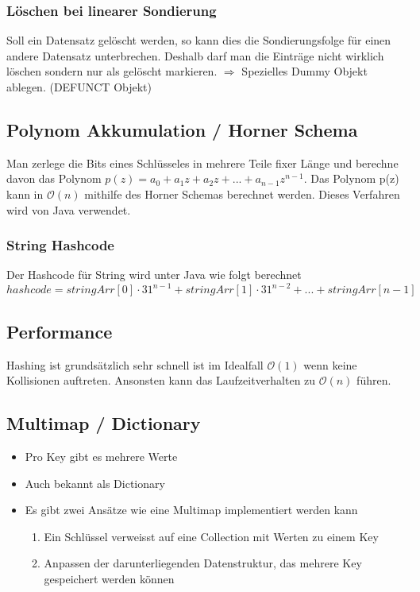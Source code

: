 \subsubsection{Löschen bei linearer Sondierung}
Soll ein Datensatz gelöscht werden, so kann dies die Sondierungsfolge für einen andere Datensatz unterbrechen. Deshalb darf man die Einträge nicht wirklich löschen sondern nur als gelöscht markieren. $\Rightarrow$ Spezielles Dummy Objekt ablegen. (DEFUNCT Objekt)

\subsection{Polynom Akkumulation / Horner Schema}
Man zerlege die Bits eines Schlüsseles in mehrere Teile fixer Länge und berechne davon das Polynom $p(z) = a_0 + a_1 z + a_2 z + ... + a_{n-1}z^{n-1}$. Das Polynom p(z) kann in $\mathcal{O}(n)$ mithilfe des Horner Schemas berechnet werden. Dieses Verfahren wird von Java verwendet.

\subsubsection{String Hashcode}
Der Hashcode für String wird unter Java wie folgt berechnet
\[
hashcode = stringArr[0] \cdot 31^{n-1} + stringArr[1] \cdot 31^{n-2} + ... + stringArr[n-1]
\]

\subsection{Performance}
Hashing ist grundsätzlich sehr schnell ist im Idealfall $\mathcal{O}(1)$ wenn keine Kollisionen auftreten. Ansonsten kann das Laufzeitverhalten zu $\mathcal{O}(n)$ führen.

\subsection{Multimap / Dictionary}
\begin{itemize}
	\item Pro Key gibt es mehrere Werte
	\item Auch bekannt als Dictionary
	\item Es gibt zwei Ansätze wie eine Multimap implementiert werden kann
	\begin{enumerate}
		\item Ein Schlüssel verweisst auf eine Collection mit Werten zu einem Key
		\item Anpassen der darunterliegenden Datenstruktur, das mehrere Key gespeichert werden können
	\end{enumerate}
\end{itemize}

